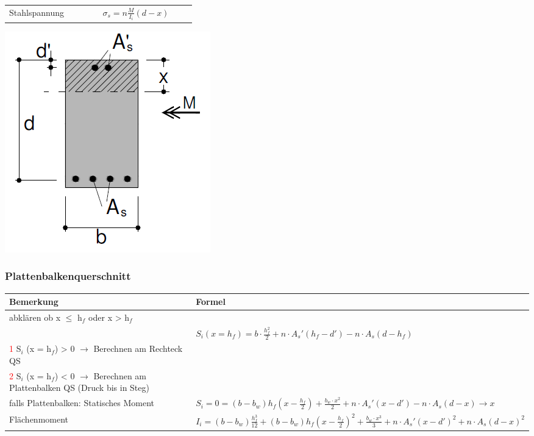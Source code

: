 \begin{landscape}
\begin{multicols}{3}
\begin{tabular}{p{0.4\linewidth}|p{0.4\linewidth}}
			Stahlspannung			& $ \sigma_s = n \frac{M}{I_i} (d - x) $	 \\
			
		\end{tabular}
		
		
		\includegraphics[width=0.4\linewidth]{images/Risse3QSRechteckm.PNG}
		
		
		
		
		
		\subsubsection{Plattenbalkenquerschnitt}
		
		
		\begin{tabular}{p{0.4\linewidth}|p{0.6\linewidth}}
			
			Bemerkung		& Formel	 \\ \hline
			
			
			abklären ob x $ \leq $ h$_f$ oder x > h$_f$ & \\
			
			& $ S_i (x = h_f) =  b \cdot \frac{h_f^2}{2} + n \cdot A_s' (h_f - d') - n \cdot A_s (d - h_f)  $   \\
			\textcolor{red}{1} S$_i$ (x = h$_f$) > 0 $ \rightarrow $ Berechnen am Rechteck QS &	 \\
			\textcolor{red}{2} S$_i$ (x = h$_f$) < 0 $ \rightarrow $ Berechnen am Plattenbalken QS (Druck bis in Steg) &	 \\
			
			falls Plattenbalken: Statisches Moment	& $ S_i = 0 = (b - b_w) h_f \left( x - \frac{h_f}{2} \right) + \frac{b_w \cdot x^2}{2} + n \cdot A_s' (x - d') - n \cdot A_s (d - x) \rightarrow x $  \\
			
			Flächenmoment		& $ I_{i} = (b - b_w) \frac{h_f^3}{12} + (b - b_w) h_f \left( x - \frac{h_f}{2} \right)^2 + \frac{b_w \cdot x^3}{3} + n \cdot A_s' (x - d')^2 + n \cdot A_s (d - x)^2 $	  \\
			

\end{tabular}
\end{multicols}
\end{landscape}
